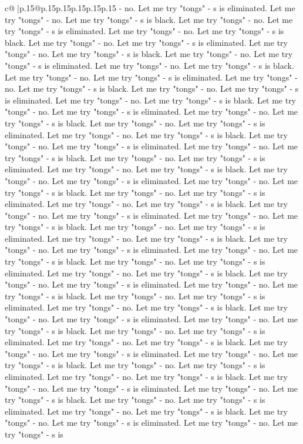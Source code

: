 \documentclass{article}
\begin{document}
{\begin{supertabular}{c@{$\;$}|p{.15\linewidth}@{}p{.15\linewidth}p{.15\linewidth}p{.15\linewidth}p{.15\linewidth}p{.15\linewidth}}
{{{{-} no. Let me try "tongs" {-} s is eliminated. Let me try "tongs" {-} no. Let me try "tongs" {-} s is black. Let me try "tongs" {-} no. Let me try "tongs" {-} s is eliminated. Let me try "tongs" {-} no. Let me try "tongs" {-} s is black. Let me try "tongs" {-} no. Let me try "tongs" {-} s is eliminated. Let me try "tongs" {-} no. Let me try "tongs" {-} s is black. Let me try "tongs" {-} no. Let me try "tongs" {-} s is eliminated. Let me try "tongs" {-} no. Let me try "tongs" {-} s is black. Let me try "tongs" {-} no. Let me try "tongs" {-} s is eliminated. Let me try "tongs" {-} no. Let me try "tongs" {-} s is black. Let me try "tongs" {-} no. Let me try "tongs" {-} s is eliminated. Let me try "tongs" {-} no. Let me try "tongs" {-} s is black. Let me try "tongs" {-} no. Let me try "tongs" {-} s is eliminated. Let me try "tongs" {-} no. Let me try "tongs" {-} s is black. Let me try "tongs" {-} no. Let me try "tongs" {-} s is eliminated. Let me try "tongs" {-} no. Let me try "tongs" {-} s is black. Let me try "tongs" {-} no. Let me try "tongs" {-} s is eliminated. Let me try "tongs" {-} no. Let me try "tongs" {-} s is black. Let me try "tongs" {-} no. Let me try "tongs" {-} s is eliminated. Let me try "tongs" {-} no. Let me try "tongs" {-} s is black. Let me try "tongs" {-} no. Let me try "tongs" {-} s is eliminated. Let me try "tongs" {-} no. Let me try "tongs" {-} s is black. Let me try "tongs" {-} no. Let me try "tongs" {-} s is eliminated. Let me try "tongs" {-} no. Let me try "tongs" {-} s is black. Let me try "tongs" {-} no. Let me try "tongs" {-} s is eliminated. Let me try "tongs" {-} no. Let me try "tongs" {-} s is black. Let me try "tongs" {-} no. Let me try "tongs" {-} s is eliminated. Let me try "tongs" {-} no. Let me try "tongs" {-} s is black. Let me try "tongs" {-} no. Let me try "tongs" {-} s is eliminated. Let me try "tongs" {-} no. Let me try "tongs" {-} s is black. Let me try "tongs" {-} no. Let me try "tongs" {-} s is eliminated. Let me try "tongs" {-} no. Let me try "tongs" {-} s is black. Let me try "tongs" {-} no. Let me try "tongs" {-} s is eliminated. Let me try "tongs" {-} no. Let me try "tongs" {-} s is black. Let me try "tongs" {-} no. Let me try "tongs" {-} s is eliminated. Let me try "tongs" {-} no. Let me try "tongs" {-} s is black. Let me try "tongs" {-} no. Let me try "tongs" {-} s is eliminated. Let me try "tongs" {-} no. Let me try "tongs" {-} s is black. Let me try "tongs" {-} no. Let me try "tongs" {-} s is eliminated. Let me try "tongs" {-} no. Let me try "tongs" {-} s is black. Let me try "tongs" {-} no. Let me try "tongs" {-} s is eliminated. Let me try "tongs" {-} no. Let me try "tongs" {-} s is black. Let me try "tongs" {-} no. Let me try "tongs" {-} s is eliminated. Let me try "tongs" {-} no. Let me try "tongs" {-} s is black. Let me try "tongs" {-} no. Let me try "tongs" {-} s is eliminated. Let me try "tongs" {-} no. Let me try "tongs" {-} s is black. Let me try "tongs" {-} no. Let me try "tongs" {-} s is eliminated. Let me try "tongs" {-} no. Let me try "tongs" {-} s is black. Let me try "tongs" {-} no. Let me try "tongs" {-} s is eliminated. Let me try "tongs" {-} no. Let me try "tongs" {-} s is }}}
\end{supertabular}}
\end{document}
